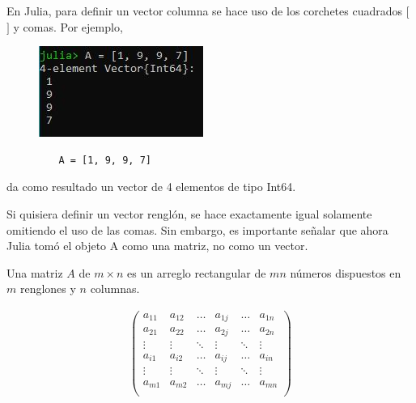 En Julia, para definir un vector columna se hace uso de los corchetes cuadrados $[$ $]$ y comas. Por ejemplo, 

\begin{figure}[h]
\begin{center}
\includegraphics[scale=0.8]{Imagenes/vector_columna_julia.JPG}
  \label{vector_columna}
\end{center}
\end{figure}

\begin{tcolorbox}
      \begin{verbatim}
         A = [1, 9, 9, 7]
      \end{verbatim}
\end{tcolorbox}
da como resultado un vector de 4 elementos de tipo Int64.

Si quisiera definir un vector renglón, se hace exactamente igual solamente omitiendo el uso de las comas. Sin embargo, es importante señalar que  ahora Julia tomó el objeto A como una matriz, no como un vector. 

\begin{definition}
Una matriz $A$ de $m \times n$ es un arreglo rectangular de $mn$ números dispuestos en $m$ renglones y $n$ columnas. 

\begin{equation*}
    \begin{aligned}
    \begin{pmatrix}
    a_{11} & a_{12} & \dots & a_{1j} & \dots & a_{1n} \\
    a_{21} & a_{22} & \dots & a_{2j} & \dots & a_{2n} \\
    \vdots &  \vdots  &  \ddots &  \vdots  & \ddots &\vdots\\
    a_{i1} & a_{i2} & \dots & a_{ij} & \dots & a_{in} \\
    \vdots &  \vdots  &  \ddots &  \vdots  & \ddots &\vdots\\
     a_{m1} & a_{m2} & \dots & a_{mj} & \dots & a_{mn} \\
    \end{pmatrix} 
    \end{aligned}
\end{equation*}
\end{definition}


